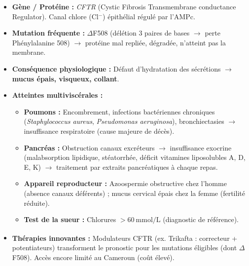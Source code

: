\documentclass[11pt]{article}
\begin{document}
\begin{exemplebox}
\begin{itemize}
    \item \textbf{Gène / Protéine :} \emph{CFTR} (Cystic Fibrosis Transmembrane conductance Regulator). Canal chlore (Cl$^-$) épithélial régulé par l'AMPc.
    \item \textbf{Mutation fréquente :} $\Delta$F508 (délétion 3 paires de bases $\rightarrow$ perte Phénylalanine 508) $\rightarrow$ protéine mal repliée, dégradée, n'atteint pas la membrane.
    \item \textbf{Conséquence physiologique :} Défaut d'hydratation des sécrétions $\rightarrow$ \textbf{mucus épais, visqueux, collant}.
    \item \textbf{Atteintes multiviscérales :}
    \begin{itemize}
        \item \textbf{Poumons :} Encombrement, infections bactériennes chroniques (\emph{Staphylococcus aureus}, \emph{Pseudomonas aeruginosa}), bronchiectasies $\rightarrow$ insuffisance respiratoire (cause majeure de décès).
        \item \textbf{Pancréas :} Obstruction canaux excréteurs $\rightarrow$ insuffisance exocrine (malabsorption lipidique, stéatorrhée, déficit vitamines liposolubles A, D, E, K) $\rightarrow$ traitement par extraits pancréatiques à chaque repas.
        \item \textbf{Appareil reproducteur :} Azoospermie obstructive chez l'homme (absence canaux déférents) ; mucus cervical épais chez la femme (fertilité réduite).
        \item \textbf{Test de la sueur :} Chlorures $> 60\ \text{mmol/L}$ (diagnostic de référence).
    \end{itemize}
    \item \textbf{Thérapies innovantes :} Modulateurs CFTR (ex. Trikafta\textsuperscript{\textregistered} : correcteur + potentiateurs) transforment le pronostic pour les mutations éligibles (dont $\Delta$F508). Accès encore limité au Cameroun (coût élevé).
\end{itemize}
\end{exemplebox}
\end{document}

